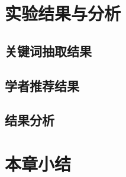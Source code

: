 \section{实验结果与分析}


\subsection{关键词抽取结果}



\subsection{学者推荐结果}




\subsection{结果分析}

\section{本章小结}



